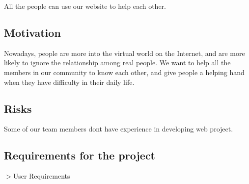 All the people can use our website to help each other. ~\newline
 \subsection*{Motivation}

Nowadays, people are more into the virtual world on the Internet, and are more likely to ignore the relationship among real people. We want to help all the members in our community to know each other, and give people a helping hand when they have difficulty in their daily life. ~\newline
 \subsection*{Risks}

Some of our team members don\textquotesingle{}t have experience in developing web project. ~\newline
 \subsection*{Requirements for the project}

$>$User Requirements~\newline

